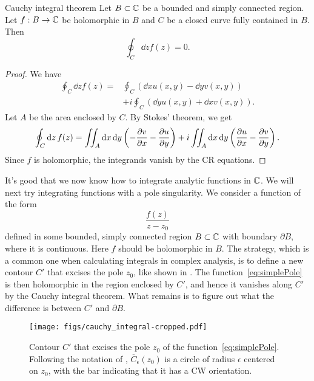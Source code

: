 \begin{theorem}{Cauchy integral theorem}{}
Let $B\subset\mathbb{C}$ be a bounded and simply connected region. Let $f:B\to\mathbb{C}$ be
holomorphic in $B$ and $C$ be a closed curve fully contained in $B$. Then
$$
  \oint_C\dd{z}f(z)=0.
$$
\begin{proof}
We have
\begin{equation*}\begin{aligned}
\oint_C\dd{z}f(z)=&\oint_C\left(\dd{x}u(x,y)-\dd{y}v(x,y)\right)\\
                 &+i\oint_C\left(\dd{y}u(x,y)+\dd{x}v(x,y)\right).
\end{aligned}\end{equation*}
Let $A$ be the area enclosed by $C$. By Stokes' theorem, we get
\begin{equation*}
\oint_C\dd{z}f(z)=\iint_A\dd{x}\dd{y}\left(-\pdv{v}{x}-\pdv{u}{y}\right)
                   +i\iint_A\dd{x}\dd{y}\left(\pdv{u}{x}-\pdv{v}{y}\right).
\end{equation*}
Since $f$ is holomorphic, the integrands vanish by the CR equations.
\end{proof}
\end{theorem}

It's good that we now know how to integrate analytic functions in $\mathbb{C}$. We will
next try integrating functions with a pole singularity. We consider a function
of the form
\begin{equation}\label{eq:simplePole}
\frac{f(z)}{z-z_0}
\end{equation}
defined in some bounded, simply connected region $B\subset\mathbb{C}$ with boundary
$\partial B$, where it is continuous. Here $f$ should be holomorphic in $B$.
The strategy, which is a
common one when calculating integrals in complex analysis, is to define a new
contour $C'$ that excises the pole $z_0$, like shown in .
The function~\eqref{eq:simplePole} is then holomorphic in the region
enclosed by $C'$, and hence it vanishes along $C'$ by the Cauchy integral
theorem.
What remains is to figure out what the difference is between $C'$ and 
$\partial B$.

\begin{figure}
\texttt{[image: figs/cauchy\_integral-cropped.pdf]}
\caption{Contour $C'$ that excises the pole $z_0$ of the
function~\eqref{eq:simplePole}. Following the notation of
, $\overline{C}_{\epsilon}(z_0)$ is a circle of
radius $\epsilon$ centered on $z_0$, with the bar indicating that it has a CW
orientation.}
\label{fig:cauchy}
\end{figure}

